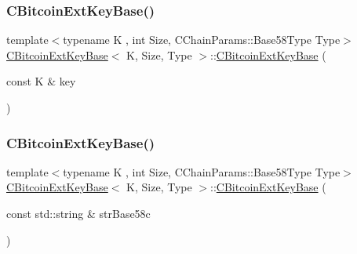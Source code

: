 \subsubsection{\texorpdfstring{C\+Bitcoin\+Ext\+Key\+Base()}{CBitcoinExtKeyBase()}\hspace{0.1cm}{\footnotesize\ttfamily [1/3]}}
{\footnotesize\ttfamily template$<$typename K , int Size, C\+Chain\+Params\+::\+Base58\+Type Type$>$ \\
\mbox{\hyperlink{class_c_bitcoin_ext_key_base}{C\+Bitcoin\+Ext\+Key\+Base}}$<$ K, Size, Type $>$\+::\mbox{\hyperlink{class_c_bitcoin_ext_key_base}{C\+Bitcoin\+Ext\+Key\+Base}} (\begin{DoxyParamCaption}\item[{const K \&}]{key }\end{DoxyParamCaption})\hspace{0.3cm}{\ttfamily [inline]}}

\mbox{\label{class_c_bitcoin_ext_key_base_af377a86f3463504c0237546b777716ce}} 
\subsubsection{\texorpdfstring{C\+Bitcoin\+Ext\+Key\+Base()}{CBitcoinExtKeyBase()}\hspace{0.1cm}{\footnotesize\ttfamily [2/3]}}
{\footnotesize\ttfamily template$<$typename K , int Size, C\+Chain\+Params\+::\+Base58\+Type Type$>$ \\
\mbox{\hyperlink{class_c_bitcoin_ext_key_base}{C\+Bitcoin\+Ext\+Key\+Base}}$<$ K, Size, Type $>$\+::\mbox{\hyperlink{class_c_bitcoin_ext_key_base}{C\+Bitcoin\+Ext\+Key\+Base}} (\begin{DoxyParamCaption}\item[{const std\+::string \&}]{str\+Base58c }\end{DoxyParamCaption})\hspace{0.3cm}{\ttfamily [inline]}}

\mbox{\label{class_c_bitcoin_ext_key_base_a0f4d52b23db0a0740c4519644e537565}} 

